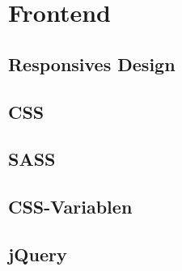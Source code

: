 \documentclass[
    headings=optiontotocandhead,%
    twoside,
    numbers=noenddot,%
    toc=flat, %
    12pt, %
    titlepage, %
    parskip=full, %
    listof=totoc, %
    listof=flat, %
    numbers=noenddot, %
    bibliography=totoc, %
    a4paper,DIV=14,
    BCOR=15mm,
]{scrbook}
\begin{document}
% 

\chapter{Frontend}\label{Frontend}

\renewcommand{\kapitelautor}{Autor: Dominik Nußbaumer}

    

\section{Responsives Design}\label{Responsives Design}

\renewcommand{\kapitelautor}{Autor: Dominik Nußbaumer}

    

\section{CSS}\label{CSS}

\renewcommand{\kapitelautor}{Autor: Dominik Nußbaumer}

    

    

    

    

\section{SASS}\label{SASS}

\renewcommand{\kapitelautor}{Autor: Dominik Nußbaumer}

    

\section{CSS-Variablen}\label{CSS-Variablen}

\renewcommand{\kapitelautor}{Autor: Dominik Nußbaumer}

    

\section{jQuery}\label{jQuery}
\end{document}
